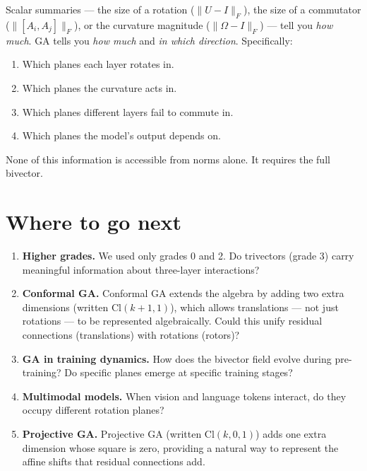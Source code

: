 \documentclass[11pt, twoside, openright]{memoir}
\begin{document}
Scalar summaries --- the size of a rotation ($\|U - I\|_F$), the size of a commutator ($\|[A_i, A_j]\|_F$), or the curvature magnitude ($\|\Omega - I\|_F$) --- tell you \emph{how much}.  GA tells you \emph{how much} and
\emph{in which direction}.  Specifically:

\begin{enumerate}[nosep]
\item Which planes each layer rotates in.
\item Which planes the curvature acts in.
\item Which planes different layers fail to commute in.
\item Which planes the model's output depends on.
\end{enumerate}

None of this information is accessible from norms alone.  It requires
the full bivector.

\section{Where to go next}

\begin{enumerate}
\item \textbf{Higher grades.}  We used only grades 0 and 2.  Do
  trivectors (grade 3) carry meaningful information about three-layer
  interactions?

\item \textbf{Conformal GA.}  Conformal GA extends the algebra by adding two extra dimensions (written $\mathrm{Cl}(k+1,1)$), which allows translations --- not just rotations --- to be represented algebraically.  Could this unify residual
  connections (translations) with rotations (rotors)?

\item \textbf{GA in training dynamics.}  How does the bivector field
  evolve during pre-training?  Do specific planes emerge at specific
  training stages?

\item \textbf{Multimodal models.}  When vision and language tokens
  interact, do they occupy different rotation planes?

\item \textbf{Projective GA.}  Projective GA (written $\mathrm{Cl}(k,0,1)$) adds one extra dimension whose square is zero, providing a natural way to represent the affine shifts that residual connections add.
\end{enumerate}
\end{document}
